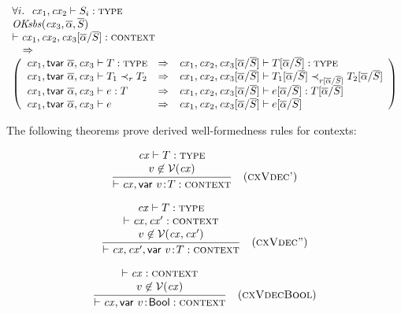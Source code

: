 \begin{theorem}\label{thm-tsbs-jdg}
\[
\begin{array}{l}
\FORALL{i}{\isty{\cx_1,\cx_2}{\typI_i}}
\\
\tsbslashok{\cx_3}{\tvarIS}{\typIS}
\\
\cxwf{\cx_1,\cx_2,\tsbslash{\cx_3}{\tvarIS}{\typIS}}
\\
\ \ \IMPLIES\\
\left(
\begin{array}{l@{\ \ \IMPLIES\ \ }l}
\isty{\cx_1,\tvdec{\tvarIS},\cx_3}{\typ} &
\isty{\cx_1,\cx_2,\tsbslash{\cx_3}{\tvarIS}{\typIS}}
     {\tsbslash{\typ}{\tvarIS}{\typIS}} \\
\issub{\cx_1,\tvdec{\tvarIS},\cx_3}{\typ_1}{\tspred}{\typ_2} &
\issub{\cx_1,\cx_2,\tsbslash{\cx_3}{\tvarIS}{\typIS}}
      {\tsbslash{\typ_1}{\tvarIS}{\typIS}}
      {\tsbslash{\tspred}{\tvarIS}{\typIS}}
      {\tsbslash{\typ_2}{\tvarIS}{\typIS}} \\
\hasty{\cx_1,\tvdec{\tvarIS},\cx_3}{\expr}{\typ} &
\hasty{\cx_1,\cx_2,\tsbslash{\cx_3}{\tvarIS}{\typIS}}
      {\tsbslash{\expr}{\tvarIS}{\typIS}}
      {\tsbslash{\typ}{\tvarIS}{\typIS}} \\
\theo{\cx_1,\tvdec{\tvarIS},\cx_3}{\expr} &
\theo{\cx_1,\cx_2,\tsbslash{\cx_3}{\tvarIS}{\typIS}}
     {\tsbslash{\expr}{\tvarIS}{\typIS}}
\end{array}
\right)
\end{array}
\]
\end{theorem}

The following theorems prove derived well-formedness rules for contexts:

\begin{theorem}\label{thm-cxvdecI}
{\rm
\[
\frac{\begin{array}{c}\mathit{cx}\vdash T:\textsc{type}\\v\not\in\mathcal{V}(\mathit{cx})\end{array}}{\vdash\mathit{cx},\mathsf{var}\ v\!:\!T:\textsc{context}}\quad\mbox{(\textsc{cxVdec'})}
\]
}
\end{theorem}

\begin{theorem}\label{thm-cxvdecII}
{\rm
\[
\frac{\begin{array}{c}\mathit{cx}\vdash T:\textsc{type}\\\vdash\mathit{cx},\mathit{cx}':\textsc{context}\\v\not\in\mathcal{V}(\mathit{cx},\mathit{cx}')\end{array}}{\vdash\mathit{cx},\mathit{cx}',\mathsf{var}\ v\!:\!T:\textsc{context}}\quad\mbox{(\textsc{cxVdec''})}
\]
}
\end{theorem}

\begin{theorem}\label{thm-cxvdecbool}
{\rm
\[
\frac{\begin{array}{c}\vdash\mathit{cx}:\textsc{context}\\v\not\in\mathcal{V}(\mathit{cx})\end{array}}{\vdash\mathit{cx},\mathsf{var}\ v\!:\!\mathsf{Bool}:\textsc{context}}\quad\mbox{(\textsc{cxVdecBool})}
\]
}
\end{theorem}

